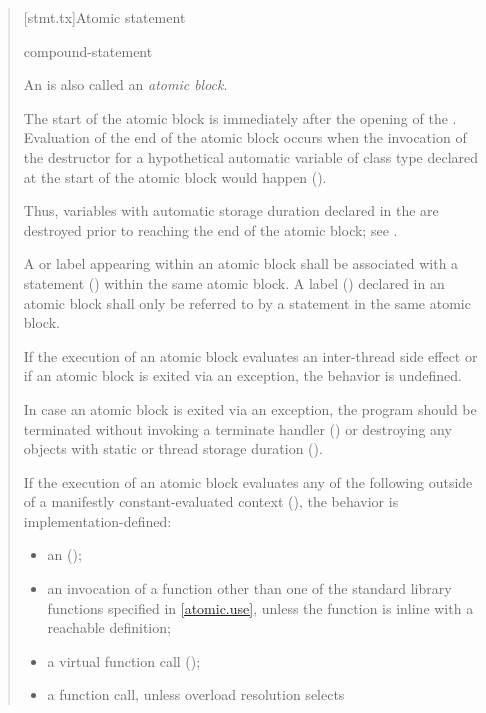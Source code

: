 \begin{quote}
[stmt.tx]{Atomic statement}  

\begin{bnf}
\br
      compound-statement
\end{bnf}

\pnum
An  is also called an \emph{atomic block}.

\pnum
The start of the atomic block is immediately after the
opening \tcode{\{} of the .
Evaluation of the end of the atomic block occurs
when the invocation of the destructor for a hypothetical automatic
variable of class type declared at the start of the atomic block would
happen ().

\begin{note}
Thus, variables with automatic storage duration
declared in the 
are destroyed prior to reaching the end of the atomic block;
see .
\end{note}

\pnum
A  or  label
appearing within an atomic block shall be associated with a
 statement () within the same
atomic block. A label () declared in an atomic block
shall only be referred to by a statement in the same atomic block.

\pnum
If the execution of an atomic block evaluates an inter-thread side
effect or if an atomic block is exited
via an exception, the behavior is undefined.

\pnum
\recommended
In case an atomic block is exited via an exception,
the program should be terminated
without invoking a terminate handler () or
destroying any objects
with static or thread storage duration ().

\pnum
If the execution of an atomic block evaluates any of the following
outside of a manifestly constant-evaluated context (),
the behavior is implementation-defined:

\begin{itemize}
\item
  an  ();
\item
  an invocation of a function other than one of the standard
  library functions specified in \ref{atomic.use}, unless
  the function is inline with a reachable definition;
\item
  a virtual function call ();
\item
  a function call, unless overload resolution selects


\end{itemize}
\end{quote}
